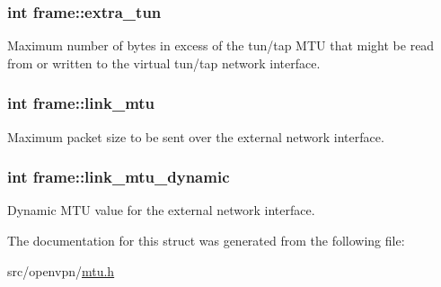 \subsubsection[{extra\+\_\+tun}]{\setlength{\rightskip}{0pt plus 5cm}int frame\+::extra\+\_\+tun}\label{structframe_a692c06fcb8a7e839f14c44616809ce10}
Maximum number of bytes in excess of the tun/tap M\+T\+U that might be read from or written to the virtual tun/tap network interface. \hypertarget{structframe_a1cb819c0d909fde0754358ab1a3efa27}{}
\subsubsection[{link\+\_\+mtu}]{\setlength{\rightskip}{0pt plus 5cm}int frame\+::link\+\_\+mtu}\label{structframe_a1cb819c0d909fde0754358ab1a3efa27}
Maximum packet size to be sent over the external network interface. \hypertarget{structframe_a6e689afc779ec821bc05750d3794e409}{}
\subsubsection[{link\+\_\+mtu\+\_\+dynamic}]{\setlength{\rightskip}{0pt plus 5cm}int frame\+::link\+\_\+mtu\+\_\+dynamic}\label{structframe_a6e689afc779ec821bc05750d3794e409}
Dynamic M\+T\+U value for the external network interface. 

The documentation for this struct was generated from the following file\+:\begin{DoxyCompactItemize}
\item 
src/openvpn/\hyperlink{mtu_8h}{mtu.\+h}\end{DoxyCompactItemize}
